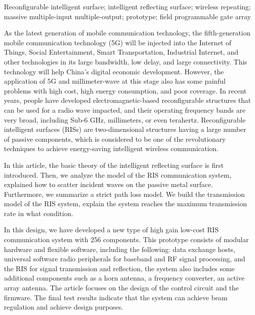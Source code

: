 \documentclass[supercite]{HustGraduPaper}
\begin{document}
\begin{enabstract}{Reconfigurable intelligent surface; intelligent reflecting surface; wireless repeating; massive multiple-input multiple-output; prototype; field programmable gate array}

	As the latest generation of mobile communication technology, the fifth-generation mobile communication technology (5G) will be injected into the Internet of Things, Social Entertainment, Smart Transportation, Industrial Internet, and other technologies in its large bandwidth, low delay, and large connectivity.
	This technology will help China's digital economic development.
	However, the application of 5G and millimeter-wave at this stage also has some painful problems with high cost, high energy consumption, and poor coverage.
	In recent years, people have developed electromagnetic-based reconfigurable structures that can be used for a radio wave impacted, and their operating frequency bands are very broad, including Sub-6 GHz, millimeters, or even terahertz.
	Reconfigurable intelligent surfaces (RISs) are two-dimensional structures having a large number of passive components, which is considered to be one of the revolutionary techniques to achieve energy-saving intelligent wireless communication.
	
	In this article, the basic theory of the intelligent reflecting surface is first introduced.
	Then, we analyze the model of the RIS communication system, explained how to scatter incident waves on the passive metal surface.
	Furthermore, we summarize a strict path loss model.
	We build the transmission model of the RIS system, explain the system reaches the maximum transmission rate in what condition.

	In this design, we have developed a new type of high gain low-cost RIS communication system with 256 components. This prototype consists of modular hardware and flexible software, including the following: data exchange hosts, universal software radio peripherals for baseband and RF signal processing, and the RIS for signal transmission and reflection, the system also includes some additional components such as a horn antenna, a frequency converter, an active array antenna. The article focuses on the design of the control circuit and the firmware. The final test results indicate that the system can achieve beam regulation and achieve design purposes.

\end{enabstract}
\end{document}
